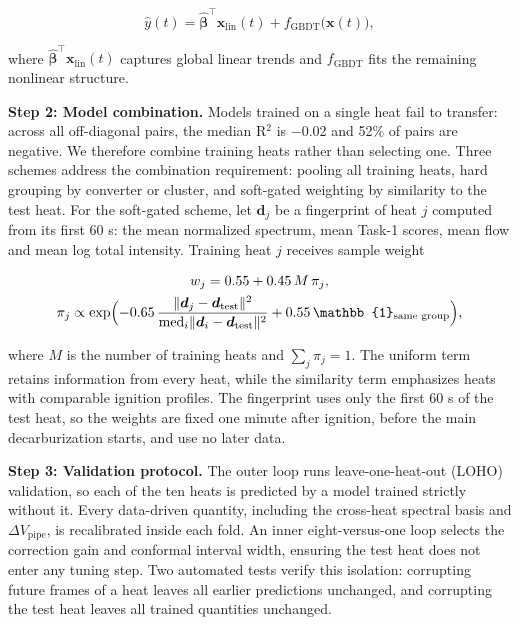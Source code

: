 \begin{equation}
\hat{y}(t) = \hat{\bm{\beta}}^{\top}\bm{x}_{\mathrm{lin}}(t) + f_{\mathrm{GBDT}}\bigl(\bm{x}(t)\bigr), \label{eq:hybrid}
\end{equation}

where $\hat{\bm{\beta}}^{\top}\bm{x}_{\mathrm{lin}}(t)$ captures global linear trends and $f_{\mathrm{GBDT}}$ fits the remaining nonlinear structure.

\textbf{Step 2: Model combination.} Models trained on a single heat fail to transfer: across all off-diagonal pairs, the median R\ensuremath{^{2}} is \ensuremath{-}0.02 and 52\% of pairs are negative. We therefore combine training heats rather than selecting one. Three schemes address the combination requirement: pooling all training heats, hard grouping by converter or cluster, and soft-gated weighting by similarity to the test heat. For the soft-gated scheme, let $\bm{d}_j$ be a fingerprint of heat $j$ computed from its first 60 s: the mean normalized spectrum, mean Task-1 scores, mean flow and mean log total intensity. Training heat $j$ receives sample weight

\begin{equation}
\begin{gathered}
  w_j = 0.55 + 0.45\,M\,\pi_j, \\
  \pi_j \propto \exp\Bigl(-0.65\,\frac{\lVert\bm{d}_j-\bm{d}_{\mathrm{test}}\rVert^2}{\operatorname{med}_i\lVert\bm{d}_i-\bm{d}_{\mathrm{test}}\rVert^2} + 0.55\,\mathbb{1}_{\text{same group}}\Bigr),
\end{gathered} \label{eq:7}
\end{equation}

where $M$ is the number of training heats and $\sum_j \pi_j = 1$. The uniform term retains information from every heat, while the similarity term emphasizes heats with comparable ignition profiles. The fingerprint uses only the first 60 s of the test heat, so the weights are fixed one minute after ignition, before the main decarburization starts, and use no later data.

\textbf{Step 3: Validation protocol.} The outer loop runs leave-one-heat-out (LOHO) validation, so each of the ten heats is predicted by a model trained strictly without it. Every data-driven quantity, including the cross-heat spectral basis and $\Delta V_{\mathrm{pipe}}$, is recalibrated inside each fold. An inner eight-versus-one loop selects the correction gain and conformal interval width, ensuring the test heat does not enter any tuning step. Two automated tests verify this isolation: corrupting future frames of a heat leaves all earlier predictions unchanged, and corrupting the test heat leaves all trained quantities unchanged.

